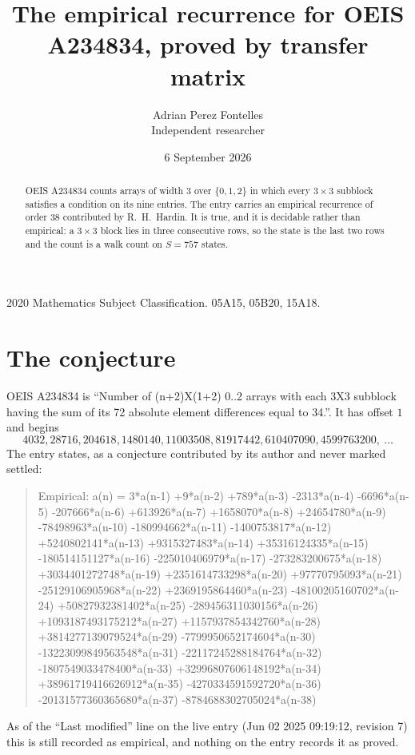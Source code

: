 \documentclass[11pt,a4paper]{article}
\title{The empirical recurrence for OEIS A234834, proved by transfer matrix}
\author{Adrian Perez Fontelles\\ \small Independent researcher}
\date{6 September 2026}
\theoremstyle{plain}
\theoremstyle{definition}
\begin{document}
\maketitle

\begin{abstract}
OEIS A234834 counts arrays of width $3$ over $\{0,1,2\}$ in which every $3\times3$ subblock
satisfies a condition on its nine entries. The entry carries an empirical recurrence of order
$38$ contributed by R.~H.~Hardin. It is true, and it is decidable rather than empirical: a
$3\times3$ block lies in three consecutive rows, so the state is the last two rows and the
count is a walk count on $S=757$ states.
\end{abstract}

\noindent\small 2020 Mathematics Subject Classification. 05A15, 05B20, 15A18.\normalsize

\section{The conjecture}

OEIS A234834 is ``Number of (n+2)X(1+2) 0..2 arrays with each 3X3 subblock having the sum of its 72 absolute element differences equal to 34.''. It has offset $1$ and begins
\[
4032, 28716, 204618, 1480140, 11003508, 81917442, 610407090, 4599763200,\ \dots
\]
The entry states, as a conjecture contributed by its author and never marked settled:
\begin{quote}
Empirical: a(n) = 3*a(n-1) +9*a(n-2) +789*a(n-3) -2313*a(n-4) -6696*a(n-5) -207666*a(n-6) +613926*a(n-7) +1658070*a(n-8) +24654780*a(n-9) -78498963*a(n-10) -180994662*a(n-11) -1400753817*a(n-12) +5240802141*a(n-13) +9315327483*a(n-14) +35316124335*a(n-15) -180514151127*a(n-16) -225010406979*a(n-17) -273283200675*a(n-18) +3034401272748*a(n-19) +2351614733298*a(n-20) +97770795093*a(n-21) -25129106905968*a(n-22) +2369195864460*a(n-23) -48100205160702*a(n-24) +50827932381402*a(n-25) -289456311030156*a(n-26) +1093187493175212*a(n-27) +1157937854342760*a(n-28) +3814277139079524*a(n-29) -7799950652174604*a(n-30) -13223099849563548*a(n-31) -22117245288184764*a(n-32) -1807549033478400*a(n-33) +32996807606148192*a(n-34) +38961719416626912*a(n-35) -4270334591592720*a(n-36) -20131577360365680*a(n-37) -8784688302705024*a(n-38)
\end{quote}
As of the ``Last modified'' line on the live entry (Jun 02 2025 09:19:12, revision 7) this is still
recorded as empirical, and nothing on the entry records it as proved.
\end{document}
